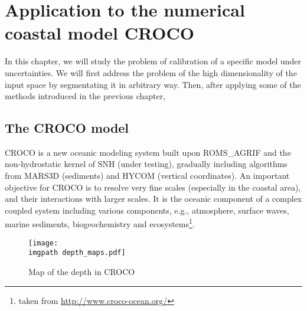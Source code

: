\documentclass[../../Main_ManuscritThese.tex]{subfiles}
\newcommand\imgpath{/home/victor/acadwriting/Manuscrit/Text/Chapter5/img/}
\begin{document}
\chapter{Application to the numerical coastal model CROCO}
\label{chap:croco}
\minitoc
\newpage
\subfileLocal{\pagestyle{contentStyle}}
In this chapter, we will study the problem of calibration of a specific model under uncertainties. We will first address the problem of the high dimensionality of the input space by segmentating it in arbitrary way. Then, after applying some of the methods introduced in the previous chapter, 


\section{The CROCO model}

CROCO is a new oceanic modeling system built upon ROMS\_AGRIF and the non-hydrostatic kernel of SNH (under testing), gradually including algorithms from MARS3D (sediments)  and HYCOM (vertical coordinates). An important objective for CROCO is to resolve very fine scales (especially in the coastal area), and their interactions with larger scales. It is the oceanic component of a complex coupled system including various components, e.g., atmosphere, surface waves, marine sediments, biogeochemistry and ecosystems\footnote{taken from \url{http://www.croco-ocean.org/}}.
\cite{mcwilliams_irreducible_2007}\cite{zanna_ocean_2011}
\begin{figure}[ht]
  \centering
  \texttt{[image: \\imgpath depth\_maps.pdf]}
  \caption{\label{fig:depth_maps} Map of the depth in CROCO}
\end{figure}
\end{document}
